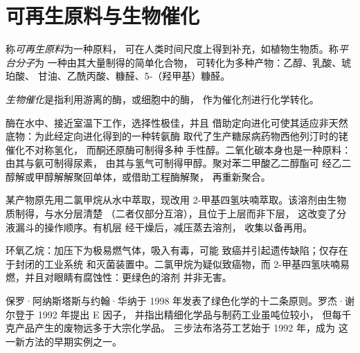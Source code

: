 \section{可再生原料与生物催化}

\begin{definition}[可再生原料]\label{def:b3:green-industrial:feedstock}
称\emph{可再生原料}为一种原料，
可在人类时间尺度上得到补充，如植物生物质。称\emph{平台分子}为
一种由其大量制得的简单化合物，
可转化为多种产物：乙醇、乳酸、琥珀酸、
甘油、乙酰丙酸、糠醛、5-（羟甲基）糠醛。
\end{definition}

\begin{definition}[生物催化]\label{def:b3:green-industrial:biocatalysis}
\emph{生物催化}是指利用游离的酶，或细胞中的酶，
作为催化剂进行化学转化。
\end{definition}

酶在水中、接近室温下工作，选择性极佳，并且
借助定向进化可使其适应非天然底物：为此经定向进化得到的一种转氨酶
取代了生产糖尿病药物西他列汀时的铑催化不对称氢化，
而酮还原酶可制得多种
手性醇。二氧化碳本身也是一种原料：由其与氨可制得尿素，
由其与氢气可制得甲醇。聚对苯二甲酸乙二醇酯可
经乙二醇解或甲醇解解聚回单体，或借助工程酶解聚，
再重新聚合。

\begin{inthelab}[后处理中替换二氯甲烷]
某产物原先用二氯甲烷从水中萃取，现改用
2-甲基四氢呋喃萃取。该溶剂由生物质制得，与水分层清楚
（二者仅部分互溶），且位于上层而非下层，
这改变了分液漏斗的操作顺序。有机层
经干燥后，减压蒸去溶剂，
收集以备再用。
\end{inthelab}

\begin{safety}{}
环氧乙烷：加压下为极易燃气体，吸入有毒，可能
致癌并引起遗传缺陷；仅存在于封闭的工业系统
和灭菌装置中。二氯甲烷为疑似致癌物，而
2-甲基四氢呋喃易燃，并且对眼睛有腐蚀性：更绿色的溶剂
并非无害。
\end{safety}

\begin{history}[十二条原则与一个数字]
保罗·阿纳斯塔斯与约翰·华纳于
1998 年发表了绿色化学的十二条原则。罗杰·谢尔登于 1992 年提出 E 因子，
并指出精细化学品与制药工业虽吨位较小，
但每千克产品产生的废物远多于大宗化学品。
三步法布洛芬工艺始于 1992 年，成为
这一新方法的早期实例之一。
\end{history}

